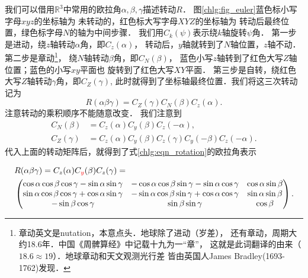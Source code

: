 我们可以借用$\mathbb{R}^3$中常用的欧拉角$\alpha,\beta,\gamma$描述转动$R$．
图\ref{chlg:fig_euler}蓝色标小写字母$xyz$的坐标轴为
未转动的，红色标大写字母$XYZ$的坐标轴为
转动后最终位置，绿色标字母$N$的轴为中间步骤．
我们用$C_k(\psi)$表示绕$k$轴旋转$\psi$角．
第一步是进动，绕$z$轴转动$\alpha$角，即$C_z(\alpha)$，
转动后，$y$轴就转到了$N$轴位置，$z$轴不动．
第二步是章动{\footnote{章动英文是nutation，本意点头．地球除了进动（岁差），
        还有章动，周期大约18.6年．中国《周髀算经》中记载十九为一“章”，
        这就是此词翻译的由来（$18.6\approx 19$）．地球章动和天文观测光行差
        皆由英国人James Bradley(1693-1762)发现．}}，
    绕$N$轴转动$\beta$角，即$C_N(\beta)$，
蓝色小写$z$轴转到了红色大写$Z$轴位置；蓝色的小写$xy$平面也
旋转到了红色大写$XY$平面．
第三步是自转，绕红色大写$Z$轴转动$\gamma$角，即$C_Z(\gamma)$,
此时就得到了坐标轴最终位置．我们将这三次转动记为
\begin{equation}\label{chlg:eqn_rotation}
    R(\alpha\beta\gamma)=C_Z(\gamma)C_N(\beta)C_z(\alpha) .
\end{equation}
注意转动的乘积顺序不能随意改变．%
我们注意到
\begin{align}
    C_N(\beta) &=C_z(\alpha)C_y(\beta)C_z(-\alpha) , \label{chlg:eqn_N_rotation} \\
    C_Z(\gamma)&=C_z(\alpha)C_y(\beta)C_z(\gamma)C_y(-\beta)C_z(-\alpha) . \label{chlg:eqn_Z_rotation}
\end{align}
代入上面的转动矩阵后，就得到了式\eqref{chlg:eqn_rotation}的欧拉角表示
\begin{small}
\setlength{\mathindent}{0em}
\begin{equation}\label{chlg:eqn_rotation_euler_y}
    \begin{aligned}
        &R(\alpha\beta\gamma)=C_z(\alpha)C_{\color{red}{y}}(\beta)C_z(\gamma) =   \\
        &\begin{pmatrix}
            \cos\alpha\cos\beta\cos\gamma -\sin\alpha \sin\gamma  &  -\cos\alpha \cos\beta \sin\gamma -\sin\alpha \cos\gamma & \cos\alpha \sin\beta  \\
            \sin\alpha\cos\beta\cos\gamma +\cos\alpha \sin\gamma  &  -\sin\alpha \cos\beta \sin\gamma +\cos\alpha \cos\gamma & \sin\alpha \sin\beta  \\
            -\sin\beta \cos\gamma & \sin\beta \sin\gamma & \cos\beta
        \end{pmatrix} .
    \end{aligned}
\end{equation}\setlength{\mathindent}{2em}
\end{small}
